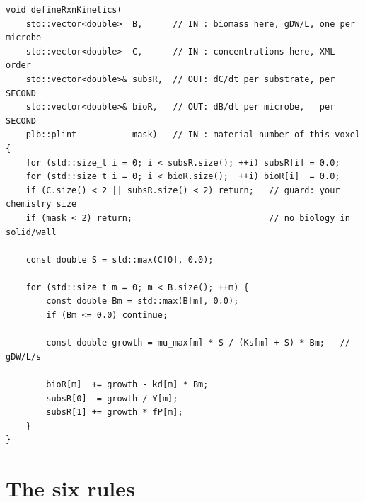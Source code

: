 \begin{lstlisting}[style=cpp]
void defineRxnKinetics(
    std::vector<double>  B,      // IN : biomass here, gDW/L, one per microbe
    std::vector<double>  C,      // IN : concentrations here, XML order
    std::vector<double>& subsR,  // OUT: dC/dt per substrate, per SECOND
    std::vector<double>& bioR,   // OUT: dB/dt per microbe,   per SECOND
    plb::plint           mask)   // IN : material number of this voxel
{
    for (std::size_t i = 0; i < subsR.size(); ++i) subsR[i] = 0.0;
    for (std::size_t i = 0; i < bioR.size();  ++i) bioR[i]  = 0.0;
    if (C.size() < 2 || subsR.size() < 2) return;   // guard: your chemistry size
    if (mask < 2) return;                           // no biology in solid/wall

    const double S = std::max(C[0], 0.0);

    for (std::size_t m = 0; m < B.size(); ++m) {
        const double Bm = std::max(B[m], 0.0);
        if (Bm <= 0.0) continue;

        const double growth = mu_max[m] * S / (Ks[m] + S) * Bm;   // gDW/L/s

        bioR[m]  += growth - kd[m] * Bm;
        subsR[0] -= growth / Y[m];
        subsR[1] += growth * fP[m];
    }
}
\end{lstlisting}

\section{The six rules}

